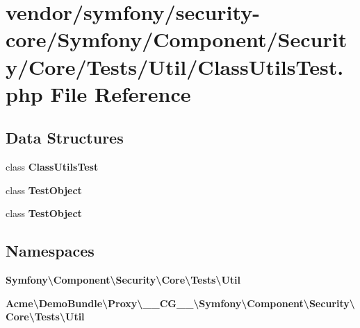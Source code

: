 \section{vendor/symfony/security-\/core/\+Symfony/\+Component/\+Security/\+Core/\+Tests/\+Util/\+Class\+Utils\+Test.php File Reference}
\label{_class_utils_test_8php}
\subsection*{Data Structures}
\begin{DoxyCompactItemize}
\item 
class {\bf Class\+Utils\+Test}
\item 
class {\bf Test\+Object}
\item 
class {\bf Test\+Object}
\end{DoxyCompactItemize}
\subsection*{Namespaces}
\begin{DoxyCompactItemize}
\item 
 {\bf Symfony\textbackslash{}\+Component\textbackslash{}\+Security\textbackslash{}\+Core\textbackslash{}\+Tests\textbackslash{}\+Util}
\item 
 {\bf Acme\textbackslash{}\+Demo\+Bundle\textbackslash{}\+Proxy\textbackslash{}\+\_\+\+\_\+\+C\+G\+\_\+\+\_\+\textbackslash{}\+Symfony\textbackslash{}\+Component\textbackslash{}\+Security\textbackslash{}\+Core\textbackslash{}\+Tests\textbackslash{}\+Util}
\end{DoxyCompactItemize}
